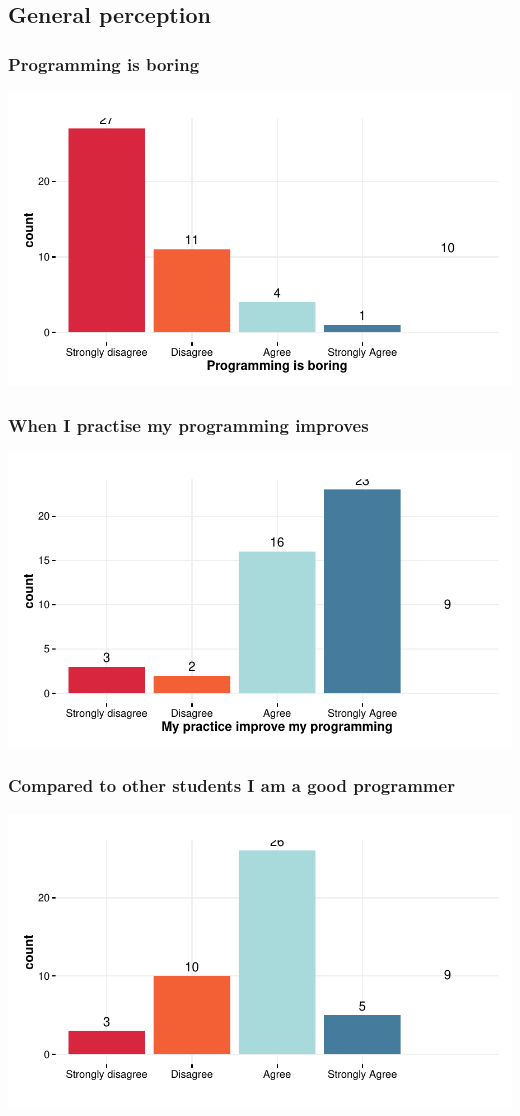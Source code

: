 \documentclass{article}
\begin{document}
\subsection{General perception}
\subsubsection{Programming is boring}
\includegraphics{Raw_num/plots/-plot_prog_ennuyant}

\subsubsection{When I practise my programming improves}
\includegraphics{Raw_num/plots/-plot_pratik_amel}

\subsubsection{Compared to other students I am a good programmer}
\includegraphics{Raw_num/plots/-plot_meilleur_prog}
\end{document}
